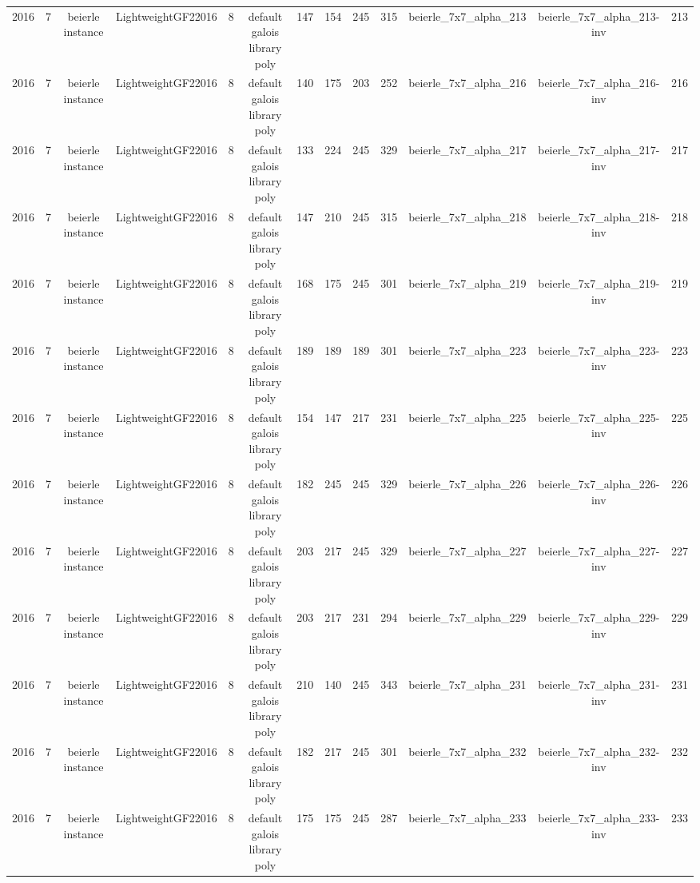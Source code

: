 \begin{tabular}{c c c c c c c c c c c c c}
2016 & 7 & beierle instance & LightweightGF22016 & 8 & default galois library poly & 147 & 154 & 245 & 315 & beierle_7x7_alpha_213 & beierle_7x7_alpha_213-inv & 213 \\
2016 & 7 & beierle instance & LightweightGF22016 & 8 & default galois library poly & 140 & 175 & 203 & 252 & beierle_7x7_alpha_216 & beierle_7x7_alpha_216-inv & 216 \\
2016 & 7 & beierle instance & LightweightGF22016 & 8 & default galois library poly & 133 & 224 & 245 & 329 & beierle_7x7_alpha_217 & beierle_7x7_alpha_217-inv & 217 \\
2016 & 7 & beierle instance & LightweightGF22016 & 8 & default galois library poly & 147 & 210 & 245 & 315 & beierle_7x7_alpha_218 & beierle_7x7_alpha_218-inv & 218 \\
2016 & 7 & beierle instance & LightweightGF22016 & 8 & default galois library poly & 168 & 175 & 245 & 301 & beierle_7x7_alpha_219 & beierle_7x7_alpha_219-inv & 219 \\
2016 & 7 & beierle instance & LightweightGF22016 & 8 & default galois library poly & 189 & 189 & 189 & 301 & beierle_7x7_alpha_223 & beierle_7x7_alpha_223-inv & 223 \\
2016 & 7 & beierle instance & LightweightGF22016 & 8 & default galois library poly & 154 & 147 & 217 & 231 & beierle_7x7_alpha_225 & beierle_7x7_alpha_225-inv & 225 \\
2016 & 7 & beierle instance & LightweightGF22016 & 8 & default galois library poly & 182 & 245 & 245 & 329 & beierle_7x7_alpha_226 & beierle_7x7_alpha_226-inv & 226 \\
2016 & 7 & beierle instance & LightweightGF22016 & 8 & default galois library poly & 203 & 217 & 245 & 329 & beierle_7x7_alpha_227 & beierle_7x7_alpha_227-inv & 227 \\
2016 & 7 & beierle instance & LightweightGF22016 & 8 & default galois library poly & 203 & 217 & 231 & 294 & beierle_7x7_alpha_229 & beierle_7x7_alpha_229-inv & 229 \\
2016 & 7 & beierle instance & LightweightGF22016 & 8 & default galois library poly & 210 & 140 & 245 & 343 & beierle_7x7_alpha_231 & beierle_7x7_alpha_231-inv & 231 \\
2016 & 7 & beierle instance & LightweightGF22016 & 8 & default galois library poly & 182 & 217 & 245 & 301 & beierle_7x7_alpha_232 & beierle_7x7_alpha_232-inv & 232 \\
2016 & 7 & beierle instance & LightweightGF22016 & 8 & default galois library poly & 175 & 175 & 245 & 287 & beierle_7x7_alpha_233 & beierle_7x7_alpha_233-inv & 233 \\

\end{tabular}
